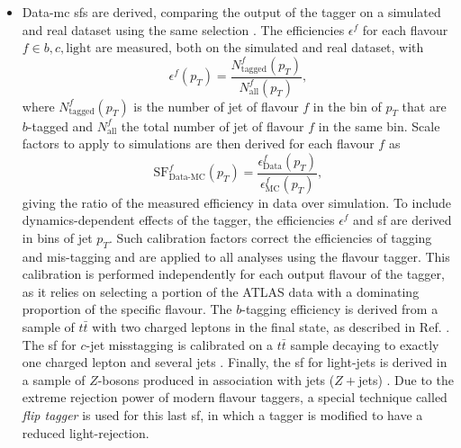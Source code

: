 \begin{itemize}[leftmargin=*]
  \item Data-\gls{mc} \glspl{sf} are derived, comparing the output of the tagger on a simulated and real dataset using the same selection \cite{Aad:2019aic, ATLAS-CONF-2018-045, ATLAS-CONF-2018-006, cjettaggingCalib}. The efficiencies $\epsilon^f$ for each flavour $f \in {b, c, \textrm{light}}$ are measured, both on the simulated and real dataset, with \[\epsilon^f(p_T) = \frac{N^f_{\textrm{tagged}}(p_T)}{N^f_{\textrm{all}}(p_T)},\] where $N^f_{\textrm{tagged}}(p_T)$ is the number of jet of flavour $f$ in the bin of $p_T$ that are $b$-tagged and $N^f_{\textrm{all}}$ the total number of jet of flavour $f$ in the same bin. Scale factors to apply to simulations are then derived for each flavour $f$ as \[\textrm{SF}^f_{\textrm{Data-MC}}(p_T) = \frac{\epsilon^f_{\textrm{Data}}(p_T)}{\epsilon^f_{\textrm{MC}}(p_T)},\] giving the ratio of the measured efficiency in data over simulation. To include dynamics-dependent effects of the tagger, the efficiencies $\epsilon^f$ and \gls{sf} are derived in bins of jet $p_T$. Such calibration factors correct the efficiencies of tagging and mis-tagging and are applied to all analyses using the flavour tagger. This calibration is performed independently for each output flavour of the tagger, as it relies on selecting a portion of the ATLAS data with a dominating proportion of the specific flavour. The $b$-tagging efficiency is derived from a sample of $t\bar{t}$ with two charged leptons in the final state, as described in Ref. \cite{Aad:2019aic}. The \gls{sf} for $c$-jet misstagging is calibrated on a $t\bar{t}$ sample decaying to exactly one charged lepton and several jets \cite{cjettaggingCalib}. Finally, the \gls{sf} for light-jets is derived in a sample of $Z$-bosons produced in association with jets ($Z+$jets) \cite{ATLAS:2023lwk}. Due to the extreme rejection power of modern flavour taggers, a special technique called \textit{flip tagger} is used for this last \gls{sf}, in which a tagger is modified to have a reduced light-rejection.

\end{itemize}
